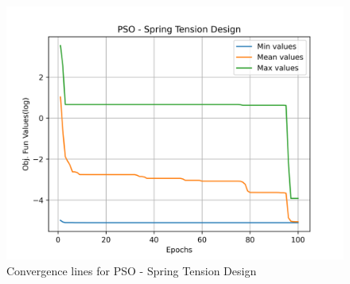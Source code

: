 \begin{figure}[H]
\centering
\caption{Convergence lines for PSO - Spring Tension Design}
\label{fig:spring_problem_solve_pso}
\includegraphics[scale=0.5]{images/spring_problem_solve_pso.png}
\end{figure}
        